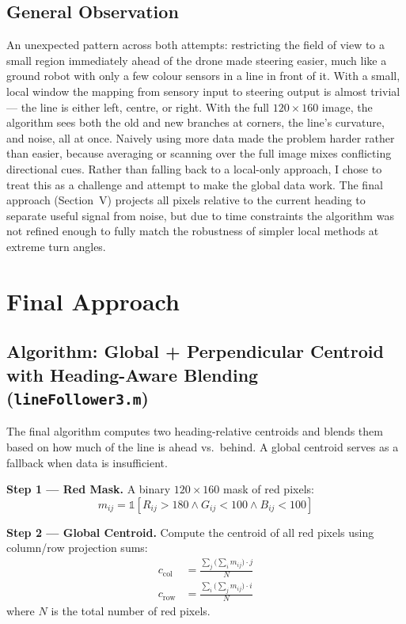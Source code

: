 \documentclass[conference, twocolumn]{IEEEtran}
\begin{document}
\subsection{General Observation}

An unexpected pattern across both attempts: restricting the field of view to a small region immediately ahead of the drone made steering easier, much like a ground robot with only a few colour sensors in a line in front of it. With a small, local window the mapping from sensory input to steering output is almost trivial --- the line is either left, centre, or right. With the full $120\times160$ image, the algorithm sees both the old and new branches at corners, the line's curvature, and noise, all at once. Naively using more data made the problem harder rather than easier, because averaging or scanning over the full image mixes conflicting directional cues. Rather than falling back to a local-only approach, I chose to treat this as a challenge and attempt to make the global data work. The final approach (Section~V) projects all pixels relative to the current heading to separate useful signal from noise, but due to time constraints the algorithm was not refined enough to fully match the robustness of simpler local methods at extreme turn angles.

\section{Final Approach}

\subsection{Algorithm: Global + Perpendicular Centroid with Heading-Aware Blending (\texttt{lineFollower3.m})}

The final algorithm computes two heading-relative centroids and blends them based on how much of the line is ahead vs.\ behind. A global centroid serves as a fallback when data is insufficient.

\textbf{Step 1 --- Red Mask.}
A binary $120\times160$ mask of red pixels:
\begin{equation}
    m_{ij} = \mathbb{1}[R_{ij}>180 \wedge G_{ij}<100 \wedge B_{ij}<100]
\end{equation}

\textbf{Step 2 --- Global Centroid.}
Compute the centroid of all red pixels using column/row projection sums:
\begin{align}
    c_{\mathrm{col}} &= \frac{\sum_{j} \bigl(\sum_{i} m_{ij}\bigr) \cdot j}{N} \\[4pt]
    c_{\mathrm{row}} &= \frac{\sum_{i} \bigl(\sum_{j} m_{ij}\bigr) \cdot i}{N}
\end{align}
where $N$ is the total number of red pixels.
\end{document}
